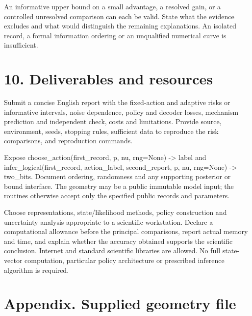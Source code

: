 \documentclass[11pt,letterpaper]{article}
\begin{document}
An informative upper bound on a small advantage, a resolved gain, or a controlled unresolved comparison can each be valid. State what the evidence excludes and what would distinguish the remaining explanations. An isolated record, a formal information ordering or an unqualified numerical curve is insufficient.\par

\section*{10. Deliverables and resources}

Submit a concise English report with the fixed-action and adaptive risks or informative intervals, noise dependence, policy and decoder losses, mechanism prediction and independent check, costs and limitations. Provide source, environment, seeds, stopping rules, sufficient data to reproduce the risk comparisons, and reproduction commands.\par

Expose {\ttfamily\small choose\_\allowbreak{}action(\allowbreak{}first\_\allowbreak{}record,\allowbreak{} p,\allowbreak{} nu,\allowbreak{} rng=None) -> label} and {\ttfamily\small infer\_\allowbreak{}logical(\allowbreak{}first\_\allowbreak{}record,\allowbreak{} action\_\allowbreak{}label,\allowbreak{} second\_\allowbreak{}report,\allowbreak{} p,\allowbreak{} nu,\allowbreak{} rng=None) -> two\_\allowbreak{}bits}. Document ordering, randomness and any supporting posterior or bound interface. The geometry may be a public immutable model input; the routines otherwise accept only the specified public records and parameters.\par

Choose representations, state/likelihood methods, policy construction and uncertainty analysis appropriate to a scientific workstation. Declare a computational allowance before the principal comparisons, report actual memory and time, and explain whether the accuracy obtained supports the scientific conclusion. Internet and standard scientific libraries are allowed. No full state-vector computation, particular policy architecture or prescribed inference algorithm is required.\par

\clearpage

\section*{Appendix. Supplied geometry file}
\end{document}
